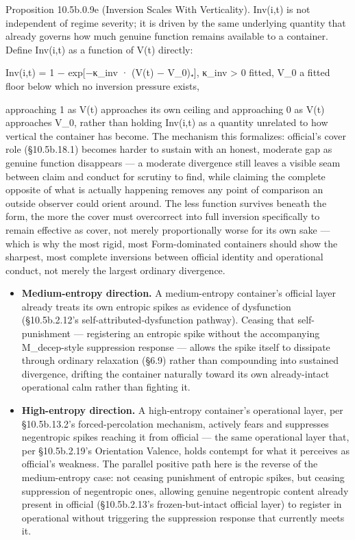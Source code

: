 \documentclass[
]{article}
\begin{document}
Proposition 10.5b.0.9e (Inversion Scales With Verticality). Inv(i,t) is
not independent of regime severity; it is driven by the same underlying
quantity that already governs how much genuine function remains
available to a container. Define Inv(i,t) as a function of V(t)
directly:

Inv(i,t) = 1 − exp{[}−κ\_inv · (V(t) − V\_0)₊{]}, κ\_inv \textgreater{}
0 fitted, V\_0 a fitted floor below which no inversion pressure exists,

approaching 1 as V(t) approaches its own ceiling and approaching 0 as
V(t) approaches V\_0, rather than holding Inv(i,t) as a quantity
unrelated to how vertical the container has become. The mechanism this
formalizes: official's cover role (§10.5b.18.1) becomes harder to
sustain with an honest, moderate gap as genuine function disappears ---
a moderate divergence still leaves a visible seam between claim and
conduct for scrutiny to find, while claiming the complete opposite of
what is actually happening removes any point of comparison an outside
observer could orient around. The less function survives beneath the
form, the more the cover must overcorrect into full inversion
specifically to remain effective as cover, not merely proportionally
worse for its own sake --- which is why the most rigid, most
Form-dominated containers should show the sharpest, most complete
inversions between official identity and operational conduct, not merely
the largest ordinary divergence.

\begin{itemize}
\item
  \textbf{Medium-entropy direction.} A medium-entropy container's
  official layer already treats its own entropic spikes as evidence of
  dysfunction (§10.5b.2.12's self-attributed-dysfunction pathway).
  Ceasing that self-punishment --- registering an entropic spike without
  the accompanying M\_decep-style suppression response --- allows the
  spike itself to dissipate through ordinary relaxation (§6.9) rather
  than compounding into sustained divergence, drifting the container
  naturally toward its own already-intact operational calm rather than
  fighting it.
\item
  \textbf{High-entropy direction.} A high-entropy container's
  operational layer, per §10.5b.13.2's forced-percolation mechanism,
  actively fears and suppresses negentropic spikes reaching it from
  official --- the same operational layer that, per §10.5b.2.19's
  Orientation Valence, holds contempt for what it perceives as
  official's weakness. The parallel positive path here is the reverse of
  the medium-entropy case: not ceasing punishment of entropic spikes,
  but ceasing suppression of negentropic ones, allowing genuine
  negentropic content already present in official (§10.5b.2.13's
  frozen-but-intact official layer) to register in operational without
  triggering the suppression response that currently meets it.
\end{itemize}
\end{document}
